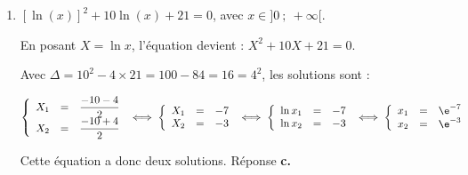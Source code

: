\begin{enumerate}
$k'(x) = \dfrac 3x - 1$, d'où $k'(\e) = \dfrac{3}{\e} - 1 = \dfrac{3 - \e}{\e}$, on obtient donc :

$M(x~;~y) \in (T) \iff y - (3 - \e) = \dfrac{3 - \e}{\e}(x- \e) \iff y  = \dfrac{3 - \e}{\e}x - 3 + \e  + 3 - \e \iff y = \dfrac{3 - \e}{\e}x$ (cette droite contient l'origine). Réponse \textbf{b.}

\item %
$[\ln (x)]^2 + 10 \ln (x) + 21 = 0$, avec $x \in ]0~;~+\infty[$.

En posant $X = \ln x$, l'équation devient : $X^2 + 10X + 21 = 0$.

Avec $\Delta = 10^2 - 4\times 21 = 100 - 84 = 16 = 4^2$, les solutions sont :

$\left\{\begin{array}{l c l}
X_1 &=&\dfrac{-10 - 4}{2}\\
X_2&=&\dfrac{-10 + 4}{2}
\end{array}\right. \iff 
\left\{\begin{array}{l c l}
X_1 &=&- 7\\
X_2&=&- 3
\end{array}\right. \iff \left\{\begin{array}{l c l}
\ln x_1 &=&-7\\
\ln x_2&=&-3
\end{array}\right. \iff 
\left\{\begin{array}{l c l}
x_1 &=&\e^{-7}\\
x_2&=&\e^{-3}
\end{array}\right.$

Cette équation a donc deux solutions. Réponse \textbf{c.}
\end{enumerate}


